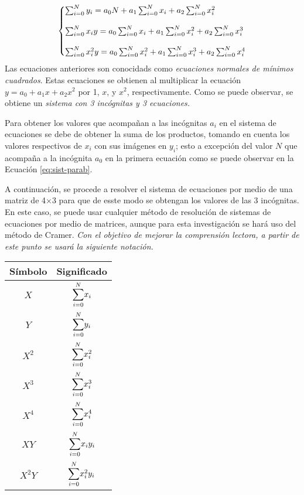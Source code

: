 \documentclass[11pt,letterpaper]{article}
\begin{document}
\begin{equation} \label{eq:sist-parab} 
	\left\{
		\begin{array}{@{}l@{}}
			\sum_{i=0}^{N} y_i  = a_0N + a_1\sum_{i=0}^{N} x_i + a_2\sum_{i=0}^{N} x_i^2 \cr\cr
			\sum_{i=0}^{N} x_iy = a_0\sum_{i=0}^{N} x_i + a_1\sum_{i=0}^{N} x_i^2 + a_2\sum_{i=0}^{N} x_i^3 \cr\cr
			\sum_{i=0}^{N} x_i^2y = a_0\sum_{i=0}^{N} x_i^2 + a_1\sum_{i=0}^{N} x_i^3 + a_2\sum_{i=0}^{N} x_i^4 		
		\end{array}
	\right.
\end{equation}
\linebreak 
Las ecuaciones anteriores  son conocidads como \textit{ecuaciones normales de mínimos cuadrados}. Estas ecuaciones se obtienen al multiplicar la ecuación $y = a_0 + a_1 x + a_2 x^2  $ por  1, $x$, y $x^2$, respectivamente. Como se puede observar, se obtiene un \emph{sistema con 3 incógnitas y 3 ecuaciones.}
\par
Para obtener los valores que acompañan a las incógnitas $a_i$ en el sistema de ecuaciones se debe de obtener la suma de los productos, tomando en cuenta los valores respectivos de $x_i$ con sus imágenes en $y_i$; esto a excepción del valor $N$ que acompaña a la incógnita $a_0$ en la primera ecuación como se puede observar en la Ecuación \ref{eq:sist-parab}.
\par
A continuación, se procede a resolver el sistema de ecuaciones por medio de una matriz de 4$\times$3 para que de esste modo se obtengan los valores de las 3 incógnitas. En este caso, se puede usar cualquier método de resolución de sistemas de ecuaciones por medio de matrices, aunque para esta investigación se hará uso del método de Cramer. \emph{ Con el objetivo de mejorar la comprensión lectora, a partir de este punto se usará la siguiente notación.}

 \begin{table}[!ht]
 \centering
	\begin{tabular}{ c c }
	\hline
	Símbolo & Significado  \\ \hline
	$X$ &	$\mathlarger{\sum}_{i=0}^{N} x_i$  \\
	$Y$ &   $\mathlarger{\sum}_{i=0}^{N} y_i$ \\
	$X^2$ & $\mathlarger{\sum}_{i=0}^{N} x_i^2$ \\
	$X^3$ & $\mathlarger{\sum}_{i=0}^{N} x_i^3$ \\ 
	$X^4$ & $\mathlarger{\sum}_{i=0}^{N} x_i^4$ \\
	$XY$ &  $\mathlarger{\sum}_{i=0}^{N} x_i y_i$	\\
	$X^2Y$& $\mathlarger{\sum}_{i=0}^{N} x^2_i y_i$	\\ \hline
	\end{tabular}
	\label{table:simbologia}
\end{table}
\end{document}
